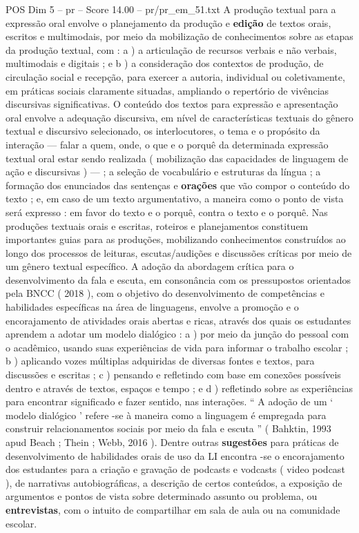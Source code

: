\begin{textsample}{POS Dim 5 – pr – Score 14.00 – pr/pr\_em\_51.txt}
A produção textual para a expressão oral envolve o planejamento da produção e \textbf{edição} de textos orais, escritos e multimodais, por meio da mobilização de conhecimentos sobre as etapas da produção textual, com : a ) a articulação de recursos verbais e não verbais, multimodais e digitais ; e b ) a consideração dos contextos de produção, de circulação social e recepção, para exercer a autoria, individual ou coletivamente, em práticas sociais claramente situadas, ampliando o repertório de vivências discursivas significativas.
O conteúdo dos textos para expressão e apresentação oral envolve a adequação discursiva, em nível de características textuais do gênero textual e discursivo selecionado, os interlocutores, o tema e o propósito da interação — falar a quem, onde, o que e o porquê da determinada expressão textual oral estar sendo realizada ( mobilização das capacidades de linguagem de ação e discursivas ) — ; a seleção de vocabulário e estruturas da língua ; a formação dos enunciados das sentenças e \textbf{orações} que vão compor o conteúdo do texto ; e, em caso de um texto argumentativo, a maneira como o ponto de vista será expresso : em favor do texto e o porquê, contra o texto e o porquê.
Nas produções textuais orais e escritas, roteiros e planejamentos constituem importantes guias para as produções, mobilizando conhecimentos construídos ao longo dos processos de leituras, escutas/audições e discussões críticas por meio de um gênero textual específico.
A adoção da abordagem crítica para o desenvolvimento da fala e escuta, em consonância com os pressupostos orientados pela BNCC ( 2018 ), com o objetivo do desenvolvimento de competências e habilidades específicas na área de linguagens, envolve a promoção e o encorajamento de atividades orais abertas e ricas, através dos quais os estudantes aprendem a adotar um modelo dialógico : a ) por meio da junção do pessoal com o acadêmico, usando suas experiências de vida para informar o trabalho escolar ; b ) aplicando vozes múltiplas adquiridas de diversas fontes e textos, para discussões e escritas ; c ) pensando e refletindo com base em conexões possíveis dentro e através de textos, espaços e tempo ; e d ) refletindo sobre as experiências para encontrar significado e fazer sentido, nas interações. “ A adoção de um ‘ modelo dialógico ’ refere -se à maneira como a linguagem é empregada para construir relacionamentos sociais por meio da fala e escuta ” ( Bahktin, 1993 apud Beach ; Thein ; Webb, 2016 ).
Dentre outras \textbf{sugestões} para práticas de desenvolvimento de habilidades orais de uso da LI encontra -se o encorajamento dos estudantes para a criação e gravação de podcasts e vodcasts ( video podcast ), de narrativas autobiográficas, a descrição de certos conteúdos, a exposição de argumentos e pontos de vista sobre determinado assunto ou problema, ou \textbf{entrevistas}, com o intuito de compartilhar em sala de aula ou na comunidade escolar.

\end{textsample}
